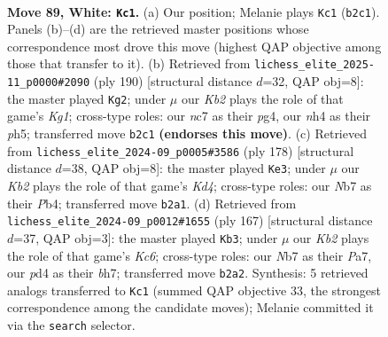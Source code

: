 \documentclass[11pt]{article}
\begin{document}
\clearpage

\begin{figure}[p]\centering
\begin{subfigure}{0.46\textwidth}\centering
\resizebox{\linewidth}{!}{%
\newchessgame
\chessboard[
  setfen={8/1Nn2k2/8/p7/Pb1pP2n/1P1B3p/1K2P3/8 w - - 44 89},
  showmover=false,
  pgfstyle=straightmove, color=movearrow, markmove={b2-c1}
]}
\caption{}
\end{subfigure}\hfill
\begin{subfigure}{0.46\textwidth}\centering
\resizebox{\linewidth}{!}{%
\newchessgame
\chessboard[
  setfen={8/8/1B6/P6p/1k2p1p1/3bP1P1/5P2/6K1 w - - 70 96},
  showmover=false,
  pgfstyle=straightmove, color=movearrow, markmove={g1-g2}
]}
\caption{}
\end{subfigure}
\\[4pt]
\begin{subfigure}{0.46\textwidth}\centering
\resizebox{\linewidth}{!}{%
\newchessgame
\chessboard[
  setfen={8/5k2/p3p3/Pb2P1Bp/1P1K3P/8/8/8 w - - 60 90},
  showmover=false,
  pgfstyle=straightmove, color=movearrow, markmove={d4-e3}
]}
\caption{}
\end{subfigure}\hfill
\begin{subfigure}{0.46\textwidth}\centering
\resizebox{\linewidth}{!}{%
\newchessgame
\chessboard[
  setfen={8/p1p4B/1p5p/1P5P/P4p2/2k1bP2/8/1K6 b - - 82 84},
  showmover=false,
  pgfstyle=straightmove, color=movearrow, markmove={c3-b3}
]}
\caption{}
\end{subfigure}
\caption{\textbf{Move 89, White: \texttt{Kc1}.} (a) Our position; Melanie plays \texttt{Kc1} (\texttt{b2c1}). Panels (b)--(d) are the retrieved master positions whose correspondence most drove this move (highest QAP objective among those that transfer to it). (b) Retrieved from \texttt{lichess\_elite\_2025-11\_p0000\#2090} (ply 190) [structural distance $d$=32, QAP obj=8]: the master played \texttt{Kg2}; under $\mu$ our \emph{Kb2} plays the role of that game's \emph{Kg1}; cross-type roles: our \emph{n}c7 as their \emph{p}g4, our \emph{n}h4 as their \emph{p}h5; transferred move \texttt{b2c1} \textbf{(endorses this move)}. (c) Retrieved from \texttt{lichess\_elite\_2024-09\_p0005\#3586} (ply 178) [structural distance $d$=38, QAP obj=8]: the master played \texttt{Ke3}; under $\mu$ our \emph{Kb2} plays the role of that game's \emph{Kd4}; cross-type roles: our \emph{N}b7 as their \emph{P}b4; transferred move \texttt{b2a1}. (d) Retrieved from \texttt{lichess\_elite\_2024-09\_p0012\#1655} (ply 167) [structural distance $d$=37, QAP obj=3]: the master played \texttt{Kb3}; under $\mu$ our \emph{Kb2} plays the role of that game's \emph{Kc6}; cross-type roles: our \emph{N}b7 as their \emph{P}a7, our \emph{p}d4 as their \emph{b}h7; transferred move \texttt{b2a2}. Synthesis: 5 retrieved analogs transferred to \texttt{Kc1} (summed QAP objective 33, the strongest correspondence among the candidate moves); Melanie committed it via the \texttt{search} selector.}
\label{fig:thought-m176}
\end{figure}
\end{document}
